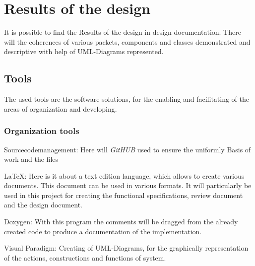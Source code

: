 \section{Results of the design}

It is possible to find the Results of the design in design documentation.
There will the coherences of various packets, components  and classes demonstrated and  descriptive  with help of UML-Diagrams	 represented.

\subsection{Tools} 

The used tools are the software solutions, for the enabling and facilitating of the areas of organization and developing.

\subsubsection{Organization tools}
	\begin{aims}
		
		\item[Sourcecodemanagement:] Here will \textit{GitHUB} used to ensure the uniformly Basis of work and the files
		
		\item[LaTeX:] Here is it about  a text edition language, which allows to create various documents. 
		This document can be used in various formats. 
		It will particularly be used in this project for creating the functional specifications, review document and the design document.   
		
		\item[Doxygen:] With this program the comments will be dragged from the already created code to produce a documentation of the implementation.
		
		\item[Visual Paradigm:] Creating of UML-Diagrams, for the graphically representation of the actions, constructions and functions of  system. 
	\end{aims}


